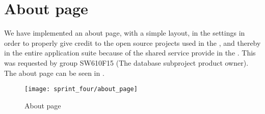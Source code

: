 
\section{About page}
\label{sec:about_page}

We have implemented an about page, with a simple layout, in the \launcher settings in order to properly give credit to the open source projects used in the \launcher, and thereby in the entire \giraf application suite because of the shared service provide in the \launcher. This was requested by group SW610F15 (The database subproject product owner). The about page can be seen in .

\begin{figure}[!htbp]
	\centering
	\texttt{[image: sprint\_four/about\_page]}
	\caption{About page}
	\label{fig:about_page}
\end{figure}
